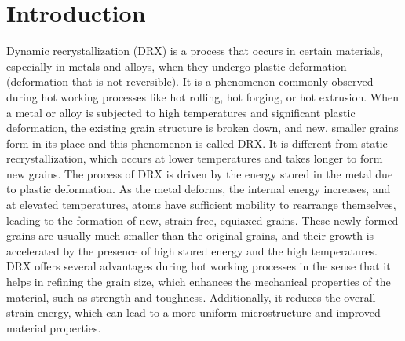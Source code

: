 \documentclass[metals,article,submit,pdftex,moreauthors]{Definitions/mdpi}
\begin{document}
\section{Introduction\label{sec:Introduction}}
Dynamic recrystallization (DRX) is a process that occurs in certain materials, especially in metals and alloys, when they undergo plastic deformation (deformation that is not reversible).
It is a phenomenon commonly observed during hot working processes like hot rolling, hot forging, or hot extrusion.
When a metal or alloy is subjected to high temperatures and significant plastic deformation, the existing grain structure is broken down, and new, smaller grains form in its place and this phenomenon is called DRX.
It is different from static recrystallization, which occurs at lower temperatures and takes longer to form new grains.
The process of DRX is driven by the energy stored in the metal due to plastic deformation.
As the metal deforms, the internal energy increases, and at elevated temperatures, atoms have sufficient mobility to rearrange themselves, leading to the formation of new, strain-free, equiaxed grains.
These newly formed grains are usually much smaller than the original grains, and their growth is accelerated by the presence of high stored energy and the high temperatures.
DRX offers several advantages during hot working processes in the sense that it helps in refining the grain size, which enhances the mechanical properties of the material, such as strength and toughness.
Additionally, it reduces the overall strain energy, which can lead to a more uniform microstructure and improved material properties.
\end{document}
